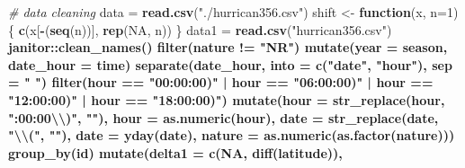 \documentclass[]{article}
\newenvironment{Shaded}{\begin{snugshade}}{\end{snugshade}}
\newcommand{\CharTok}[1]{\textcolor[rgb]{0.31,0.60,0.02}{#1}}
\newcommand{\CommentTok}[1]{\textcolor[rgb]{0.56,0.35,0.01}{\textit{#1}}}
\newcommand{\ControlFlowTok}[1]{\textcolor[rgb]{0.13,0.29,0.53}{\textbf{#1}}}
\newcommand{\DataTypeTok}[1]{\textcolor[rgb]{0.13,0.29,0.53}{#1}}
\newcommand{\DecValTok}[1]{\textcolor[rgb]{0.00,0.00,0.81}{#1}}
\newcommand{\KeywordTok}[1]{\textcolor[rgb]{0.13,0.29,0.53}{\textbf{#1}}}
\newcommand{\NormalTok}[1]{#1}
\newcommand{\OperatorTok}[1]{\textcolor[rgb]{0.81,0.36,0.00}{\textbf{#1}}}
\newcommand{\OtherTok}[1]{\textcolor[rgb]{0.56,0.35,0.01}{#1}}
\newcommand{\StringTok}[1]{\textcolor[rgb]{0.31,0.60,0.02}{#1}}
\begin{document}
\begin{Shaded}
\begin{Highlighting}[]
\CommentTok{# data cleaning}
\NormalTok{data =}\StringTok{ }\KeywordTok{read.csv}\NormalTok{(}\StringTok{"./hurrican356.csv"}\NormalTok{)}
\NormalTok{shift <-}\StringTok{ }\ControlFlowTok{function}\NormalTok{(x, }\DataTypeTok{n=}\DecValTok{1}\NormalTok{)\{}
  \KeywordTok{c}\NormalTok{(x[}\OperatorTok{-}\NormalTok{(}\KeywordTok{seq}\NormalTok{(n))], }\KeywordTok{rep}\NormalTok{(}\OtherTok{NA}\NormalTok{, n))}
\NormalTok{\}}
\NormalTok{data1 =}\StringTok{ }\KeywordTok{read.csv}\NormalTok{(}\StringTok{"hurrican356.csv"}\NormalTok{) }\OperatorTok{%>%}\StringTok{ }
\StringTok{  }\NormalTok{janitor}\OperatorTok{::}\KeywordTok{clean_names}\NormalTok{() }\OperatorTok{%>%}\StringTok{ }
\StringTok{  }\KeywordTok{filter}\NormalTok{(nature }\OperatorTok{!=}\StringTok{ "NR"}\NormalTok{) }\OperatorTok{%>%}\StringTok{ }
\StringTok{  }\KeywordTok{mutate}\NormalTok{(}\DataTypeTok{year =}\NormalTok{ season,}
         \DataTypeTok{date_hour =}\NormalTok{ time) }\OperatorTok{%>%}\StringTok{ }
\StringTok{  }\KeywordTok{separate}\NormalTok{(date_hour, }\DataTypeTok{into =} \KeywordTok{c}\NormalTok{(}\StringTok{"date"}\NormalTok{, }\StringTok{"hour"}\NormalTok{), }\DataTypeTok{sep =} \StringTok{" "}\NormalTok{) }\OperatorTok{%>%}\StringTok{ }
\StringTok{  }\KeywordTok{filter}\NormalTok{(hour }\OperatorTok{==}\StringTok{ "00:00:00)"} \OperatorTok{|}\StringTok{ }\NormalTok{hour }\OperatorTok{==}\StringTok{ "06:00:00)"} \OperatorTok{|}\StringTok{ }\NormalTok{hour }\OperatorTok{==}\StringTok{ "12:00:00)"} \OperatorTok{|}\StringTok{ }\NormalTok{hour }\OperatorTok{==}\StringTok{ "18:00:00)"}\NormalTok{) }\OperatorTok{%>%}\StringTok{ }
\StringTok{  }\KeywordTok{mutate}\NormalTok{(}\DataTypeTok{hour =} \KeywordTok{str_replace}\NormalTok{(hour, }\StringTok{":00:00}\CharTok{\textbackslash{}\textbackslash{}}\StringTok{)"}\NormalTok{, }\StringTok{""}\NormalTok{),}
         \DataTypeTok{hour =} \KeywordTok{as.numeric}\NormalTok{(hour),}
         \DataTypeTok{date =} \KeywordTok{str_replace}\NormalTok{(date, }\StringTok{"}\CharTok{\textbackslash{}\textbackslash{}}\StringTok{("}\NormalTok{, }\StringTok{""}\NormalTok{),}
         \DataTypeTok{date =} \KeywordTok{yday}\NormalTok{(date),}
         \DataTypeTok{nature =} \KeywordTok{as.numeric}\NormalTok{(}\KeywordTok{as.factor}\NormalTok{(nature))) }\OperatorTok{%>%}\StringTok{ }
\StringTok{  }\KeywordTok{group_by}\NormalTok{(id) }\OperatorTok{%>%}\StringTok{ }
\StringTok{  }\KeywordTok{mutate}\NormalTok{(}\DataTypeTok{delta1 =} \KeywordTok{c}\NormalTok{(}\OtherTok{NA}\NormalTok{, }\KeywordTok{diff}\NormalTok{(latitude)),}
}}}}}}}}
\end{Highlighting}
\end{Shaded}
\end{document}
